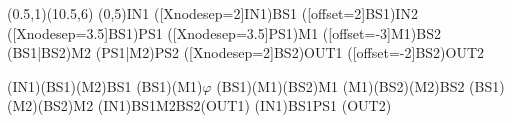 \documentclass[pstricks]{standalone}
\begin{document}
	\begin{pspicture}(0.5,1)(10.5,6)
        \pnode(0,5){IN1}
        \pnode([Xnodesep=2]IN1){BS1}
        \pnode([offset=2]BS1){IN2}
        \pnode([Xnodesep=3.5]BS1){PS1}
        \pnode([Xnodesep=3.5]PS1){M1}
        \pnode([offset=-3]M1){BS2}
        \pnode(BS1|BS2){M2}
        \pnode(PS1|M2){PS2}
        \pnode([Xnodesep=2]BS2){OUT1}
        \pnode([offset=-2]BS2){OUT2}
        \begin{optexp}
            \beamsplitter[compname=BS1, labelangle=45, labeloffset=1](IN1)(BS1)(M2){BS1}
            \optbox[compname=PS1, innerlabel, optboxsize=1.0 0.8](BS1)(M1){$\varphi$}
            \mirror[compname=M1, labeloffset=0.6](BS1)(M1)(BS2){M1}
            \beamsplitter[compname=BS2, labelangle=-45, labeloffset=1](M1)(BS2)(M2){BS2}
            \mirror[compname=M2, labeloffset=0.6](BS1)(M2)(BS2){M2}
			\drawbeam(IN1){BS1}{M2}{BS2}(OUT1)
			\drawbeam(IN1){BS1}{PS1}
			(OUT2)
        \end{optexp}
    \end{pspicture}
\end{document}
